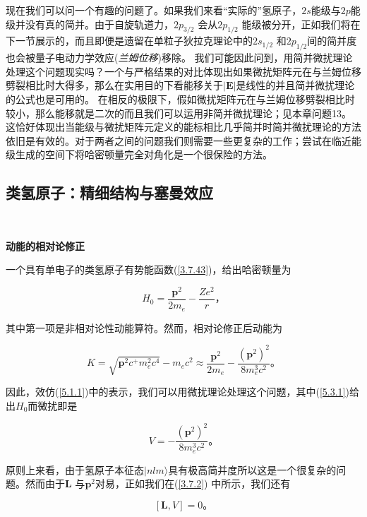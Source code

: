 ﻿\documentclass[UTF8,twoside]{ctexart}
\begin{document}
现在我们可以问一个有趣的问题了。如果我们来看“实际的”氢原子，$2s$能级与$2p$能级并没有真的简并。由于自旋轨道力，$2p_{3/2}$ 会从$2p_{1/2}$ 能级被分开，正如我们将在下一节展示的，而且即便是遗留在单粒子狄拉克理论中的$2s_{1/2}$ 和$2p_{1/2}$间的简并度也会被量子电动力学效应(\emph{兰姆位移})移除。 我们可能因此问到，用简并微扰理论处理这个问题现实吗？一个与严格结果的对比体现出如果微扰矩阵元在与兰姆位移劈裂相比时大得多，那么在实用目的下看能移关于$|\boldsymbol{E}|$是线性的并且简并微扰理论的公式也是可用的。 在相反的极限下，假如微扰矩阵元在与兰姆位移劈裂相比时较小，那么能移就是二次的而且我们可以运用非简并微扰理论；见本章问题13。 这恰好体现出当能级与微扰矩阵元定义的能标相比几乎简并时简并微扰理论的方法依旧是有效的。对于两者之间的问题我们则需要一些更复杂的工作；尝试在临近能级生成的空间下将哈密顿量完全对角化是一个很保险的方法。

\subsection{类氢原子：精细结构与塞曼效应}

\

\noindent \textbf{动能的相对论修正}

\noindent 一个具有单电子的类氢原子有势能函数(\ref{3.7.43})，给出哈密顿量为

\begin{equation} \label{5.3.1}
H_0 = \dfrac{\boldsymbol{p}^2}{2m_e}-\dfrac{Ze^2}{r}\text{，}
\end{equation}

\noindent 其中第一项是非相对论性动能算符。然而，相对论修正后动能为

\begin{equation} \label{5.3.2}
K=\sqrt{\boldsymbol{p}^2c^+m_e^2c^4}-m_ec^2\approx \dfrac{\boldsymbol{p}^2}{2m_e}-\dfrac{(\boldsymbol{p}^2)^2}{8m_e^3c^2}\text{。}
\end{equation}

\noindent 因此，效仿(\ref{5.1.1})中的表示，我们可以用微扰理论处理这个问题，其中(\ref{5.3.1})给出$H_0$而微扰即是

\begin{equation} \label{5.3.3}
V= -\dfrac{(\boldsymbol{p}^2)^2}{8m_e^3c^2}\text{。}
\end{equation}

原则上来看，由于氢原子本征态$|nlm\rangle$具有极高简并度所以这是一个很复杂的问题。然而由于$\boldsymbol{L}$ 与$\boldsymbol{p}^2$对易，正如我们在(\ref{3.7.2}) 中所示，我们还有

\begin{equation} \label{5.3.4}
[\boldsymbol{L},V]=0\text{。}
\end{equation}
\end{document}
